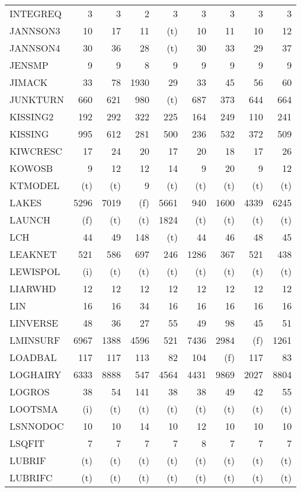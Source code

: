 \documentclass[11pt,twoside]{article}
\begin{document}
{\begin{longtable}[c]{|l|r|r|r|r|r|r|r|r|}
 INTEGREQ & 3 & 3 & 2 & 3 & 3 & 3 & 3 & 3 \\
 JANNSON3 & 10 & 17 & 11 & (t) & 10 & 11 & 10 & 12 \\
 JANNSON4 & 30 & 36 & 28 & (t) & 30 & 33 & 29 & 37 \\
 JENSMP & 9 & 9 & 8 & 9 & 9 & 9 & 9 & 9 \\
 JIMACK & 33 & 78 & 1930 & 29 & 33 & 45 & 56 & 60 \\
 JUNKTURN & 660 & 621 & 980 & (t) & 687 & 373 & 644 & 664 \\
 KISSING2 & 192 & 292 & 322 & 225 & 164 & 249 & 110 & 241 \\
 KISSING & 995 & 612 & 281 & 500 & 236 & 532 & 372 & 509 \\
 KIWCRESC & 17 & 24 & 20 & 17 & 20 & 18 & 17 & 26 \\
 KOWOSB & 9 & 12 & 12 & 14 & 9 & 20 & 9 & 12 \\
 KTMODEL & (t) & (t) & 9 & (t) & (t) & (t) & (t) & (t) \\
 LAKES & 5296 & 7019 & (f) & 5661 & 940 & 1600 & 4339 & 6245 \\
 LAUNCH & (f) & (t) & (t) & 1824 & (t) & (t) & (t) & (t) \\
 LCH & 44 & 49 & 148 & (t) & 44 & 46 & 48 & 45 \\
 LEAKNET & 521 & 586 & 697 & 246 & 1286 & 367 & 521 & 438 \\
 LEWISPOL & (i) & (t) & (t) & (t) & (t) & (t) & (t) & (t) \\
 LIARWHD & 12 & 12 & 12 & 12 & 12 & 12 & 12 & 12 \\
 LIN & 16 & 16 & 34 & 16 & 16 & 16 & 16 & 16 \\
 LINVERSE & 48 & 36 & 27 & 55 & 49 & 98 & 45 & 51 \\
 LMINSURF & 6967 & 1388 & 4596 & 521 & 7436 & 2984 & (f) & 1261 \\
 LOADBAL & 117 & 117 & 113 & 82 & 104 & (f) & 117 & 83 \\
 LOGHAIRY & 6333 & 8888 & 547 & 4564 & 4431 & 9869 & 2027 & 8804 \\
 LOGROS & 38 & 54 & 141 & 38 & 38 & 49 & 42 & 55 \\
 LOOTSMA & (i) & (t) & (t) & (t) & (t) & (t) & (t) & (t) \\
 LSNNODOC & 10 & 10 & 14 & 10 & 12 & 10 & 10 & 10 \\
 LSQFIT & 7 & 7 & 7 & 7 & 8 & 7 & 7 & 7 \\
 LUBRIF & (t) & (t) & (t) & (t) & (t) & (t) & (t) & (t) \\
 LUBRIFC & (t) & (t) & (t) & (t) & (t) & (t) & (t) & (t) \\

\end{longtable}}
\end{document}

